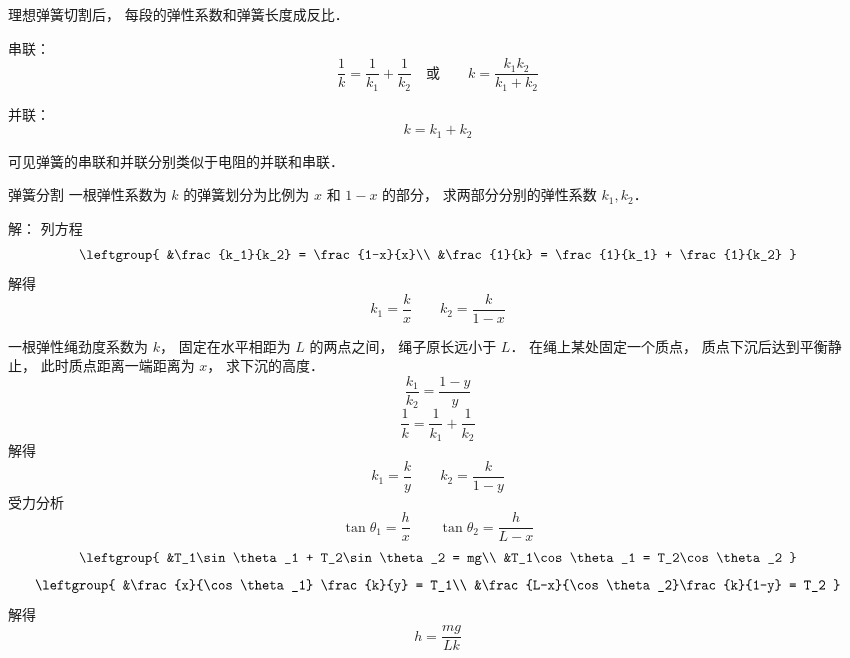 
\begin{issues}
\issueDraft
\end{issues}


理想弹簧切割后， 每段的弹性系数和弹簧长度成反比．

串联：
\begin{equation}
\frac{1}{k} = \frac{1}{k_1} + \frac{1}{k_2}
\quad \text{或} \qquad
k = \frac{k_1 k_2}{k_1 + k_2}
\end{equation}

并联：
\begin{equation}
k = k_1 + k_2
\end{equation}

可见弹簧的串联和并联分别类似于电阻的并联和串联．


\begin{example}{弹簧分割}
一根弹性系数为 $k$ 的弹簧划分为比例为 $x$ 和 $1-x$ 的部分， 求两部分分别的弹性系数 $k_1, k_2$．

解： 列方程
\begin{equation}
\leftgroup{
&\frac{k_1}{k_2} = \frac{1-x}{x}\\
&\frac{1}{k} = \frac{1}{k_1} + \frac{1}{k_2}
}
\end{equation}
解得
\begin{equation}
k_1 = \frac{k}{x} \qquad k_2 = \frac{k}{1-x}
\end{equation}
\end{example}

\begin{example}{}
一根弹性绳劲度系数为 $k$， 固定在水平相距为 $L$ 的两点之间， 绳子原长远小于 $L$． 在绳上某处固定一个质点， 质点下沉后达到平衡静止， 此时质点距离一端距离为 $x$， 求下沉的高度．
\begin{equation}
\frac{k_1}{k_2} = \frac{1-y}{y}
\end{equation}
\begin{equation}
\frac{1}{k} = \frac{1}{k_1} + \frac{1}{k_2}
\end{equation}
解得
\begin{equation}
k_1 = \frac{k}{y} \qquad
k_2 = \frac{k}{1-y}
\end{equation}
受力分析
\begin{equation}
\tan\theta_1 = \frac{h}{x}
\qquad
\tan\theta_2 = \frac{h}{L-x}
\end{equation}
\begin{equation}
\leftgroup{
&T_1\sin\theta_1 + T_2\sin\theta_2 = mg\\
&T_1\cos\theta_1 = T_2\cos\theta_2
}
\end{equation}
\begin{equation}
\leftgroup{
&\frac{x}{\cos\theta_1} \frac{k}{y} = T_1\\
&\frac{L-x}{\cos\theta_2}\frac{k}{1-y} = T_2
}
\end{equation}
解得
\begin{equation}
h = \frac{mg}{Lk}
\end{equation}
\end{example}
